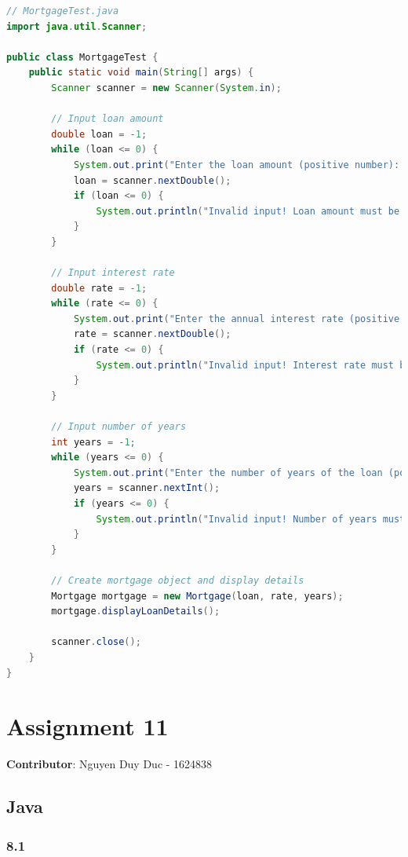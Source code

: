 \documentclass{article}
\begin{document}
\begin{lstlisting}[language=Java, caption=MortageTest.java]
// MortgageTest.java
import java.util.Scanner;

public class MortgageTest {
    public static void main(String[] args) {
        Scanner scanner = new Scanner(System.in);

        // Input loan amount
        double loan = -1;
        while (loan <= 0) {
            System.out.print("Enter the loan amount (positive number): ");
            loan = scanner.nextDouble();
            if (loan <= 0) {
                System.out.println("Invalid input! Loan amount must be positive.");
            }
        }

        // Input interest rate
        double rate = -1;
        while (rate <= 0) {
            System.out.print("Enter the annual interest rate (positive number): ");
            rate = scanner.nextDouble();
            if (rate <= 0) {
                System.out.println("Invalid input! Interest rate must be positive.");
            }
        }

        // Input number of years
        int years = -1;
        while (years <= 0) {
            System.out.print("Enter the number of years of the loan (positive number): ");
            years = scanner.nextInt();
            if (years <= 0) {
                System.out.println("Invalid input! Number of years must be positive.");
            }
        }

        // Create mortgage object and display details
        Mortgage mortgage = new Mortgage(loan, rate, years);
        mortgage.displayLoanDetails();

        scanner.close();
    }
}
\end{lstlisting}

\section*{Assignment 11}

\textbf{Contributor}: Nguyen Duy Duc - 1624838

\subsection*{Java}

\subsubsection*{8.1}
\end{document}
